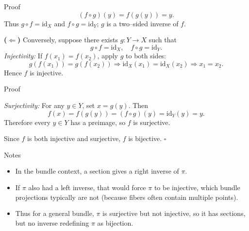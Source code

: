 \documentclass[11pt,aspectratio=43,ignorenonframetext,t]{beamer}
\begin{document}
\begin{frame}{Proof}
\[
(f \circ g)(y) = f(g(y)) = y.
\]
Thus \(g\circ f = \mathrm{id}_X\) and \(f\circ g = \mathrm{id}_Y\); \(g\) is a two–sided inverse of \(f.\)

\medskip
\textbf{($\Leftarrow$)}  
Conversely, suppose there exists \(g : Y \to X\) such that
\[
g \circ f = \mathrm{id}_X, \quad f \circ g = \mathrm{id}_Y.
\]
\emph{Injectivity:}  
If \(f(x_1)=f(x_2)\), apply \(g\) to both sides:
\[
g(f(x_1)) = g(f(x_2)) \Rightarrow \mathrm{id}_X(x_1)=\mathrm{id}_X(x_2) \Rightarrow x_1=x_2.
\]
Hence \(f\) is injective.

\end{frame}

\begin{frame}{Proof}

\emph{Surjectivity:}  
For any \(y \in Y\), set \(x=g(y)\). Then
\[
f(x)=f(g(y))=(f\circ g)(y)=\mathrm{id}_Y(y)=y.
\]
Therefore every \(y\in Y\) has a preimage, so \(f\) is surjective.

Since \(f\) is both injective and surjective, \(f\) is bijective. \(\square\)

\end{frame}


\begin{frame}{Notes}
\begin{itemize}
    \item In the bundle context, a section gives a right inverse of \(\pi\).  
    \item If \(\pi\) also had a left inverse, that would force \(\pi\) to be injective, which bundle projections typically are not (because fibers often contain multiple points).
    \item Thus for a general bundle, \(\pi\) is surjective but not injective, so it has sections, but no inverse redefining \(\pi\) as bijection.
\end{itemize}

\end{frame}
\end{document}
